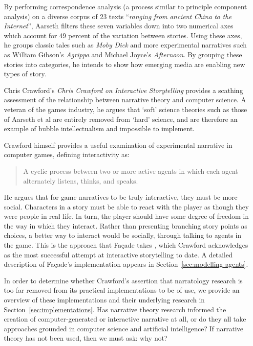 \documentclass[11pt]{report}
\begin{document}

By performing correspondence analysis (a process similar to principle component analysis) on a diverse corpus of 23 texts ``\emph{ranging from ancient China to the Internet}'', Aarseth filters these seven variables down into two numerical axes which account for 49 percent of the variation between stories. Using these axes, he groups classic tales such as \emph{Moby Dick} and more experimental narratives such as William Gibson's \emph{Agrippa} and Michael Joyce's \emph{Afternoon}. By grouping these stories into categories, he intends to show how emerging media are enabling new types of story.

Chris Crawford's \emph{Chris Crawford on Interactive Storytelling} \citep{crawford2012chris} provides a scathing assessment of the relationship between narrative theory and computer science. A veteran of the games industry, he argues that `soft' science theories such as those of Aarseth et al are entirely removed from `hard' science, and are therefore an example of bubble intellectualism and impossible to implement. 

Crawford himself provides a useful examination of experimental narrative in computer games, defining interactivity as:

\begin{quote}
A cyclic process between two or more active agents in which each agent alternately listens, thinks, and speaks.
\end{quote}

He argues that for game narratives to be truly interactive, they must be more social. Characters in a story must be able to react with the player as though they were people in real life. In turn, the player should have some degree of freedom in the way in which they interact. Rather than presenting branching story points as choices, a better way to interact would be socially, through talking to agents in the game. This is the approach that Fa\c{c}ade takes \citep{mateas2003faccade}, which Crawford acknowledges as the most successful attempt at interactive storytelling to date. A detailed description of Fa\c{c}ade's implementation appears in Section~\ref{sec:modelling-agents}.

In order to determine whether Crawford's assertion that narratology research is
too far removed from its practical implementations to be of use, we provide an
overview of these implementations and their underlying research in Section~\ref{sec:implementations}. Has narrative theory research informed the creation of computer-generated or interactive narrative at all, or do they all take approaches grounded in computer science and artificial intelligence? If narrative theory has not been used, then we must ask: why not?
\end{document}
